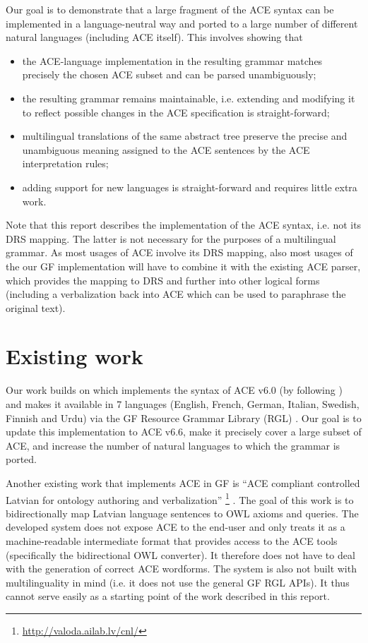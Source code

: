 \documentclass[a4paper]{article}
\begin{document}
Our goal is to demonstrate that a large fragment of the ACE syntax
can be implemented in a language-neutral way and ported to a large number
of different natural languages (including ACE itself).
This involves showing that

\begin{itemize}
\item the ACE-language implementation in the resulting grammar matches
precisely the chosen ACE subset and can be parsed unambiguously;
\item the resulting grammar remains maintainable, i.e. extending and modifying
it to reflect possible changes in the ACE specification is straight-forward;
\item multilingual translations of the same abstract tree preserve the precise
and unambiguous meaning assigned to the ACE sentences by the ACE interpretation
rules;
\item adding support for new languages is straight-forward and requires little
extra work.
\end{itemize}

Note that this report describes the implementation of the ACE syntax,
i.e. not its DRS mapping. The latter is not necessary for the purposes of a
multilingual grammar. As most usages of ACE involve its DRS mapping, also
most usages of the our GF implementation
will have to combine it with the existing ACE parser, which provides the
mapping to DRS and further into other logical forms (including a verbalization
back into ACE which can be used to paraphrase the original text).


\section{Existing work}
\label{section:Existing_work}

Our work builds on \cite{ranta:cnl2009_revised} which implements the syntax
of ACE v6.0 (by following \cite{ACE_6.0_Construction_Rules}) and makes it
available in 7 languages (English, French, German, Italian, Swedish, Finnish
and Urdu) via the GF Resource Grammar Library (RGL) \cite{ranta:lilt2009}.
Our goal is to update this implementation to ACE v6.6, make it precisely
cover a large subset of ACE, and increase the number of natural languages to
which the grammar is ported.

Another existing work that implements ACE in GF is
``ACE compliant controlled Latvian for ontology authoring and verbalization''
\footnote{\url{http://valoda.ailab.lv/cnl/}}
\cite{gruzitis:phd}. The goal of this work is to bidirectionally map Latvian
language sentences to OWL axioms and queries. The developed system
does not expose ACE to the end-user and only treats it as a
machine-readable intermediate format that provides access to the ACE tools
(specifically the bidirectional OWL converter).
It therefore does not have to deal with the
generation of correct ACE wordforms.
The system is also not built with multilinguality in mind
(i.e. it does not use the general GF RGL APIs). It thus cannot serve easily as
a starting point of the work described in this report.
\end{document}

